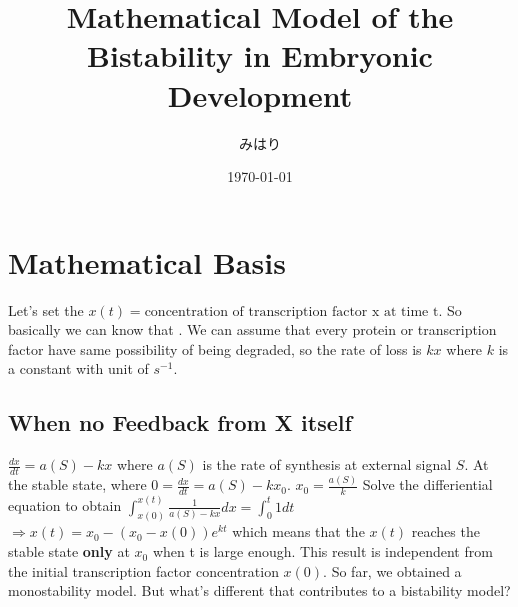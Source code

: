\documentclass[UTF8,12pt,a4paper,fontset=fandol]{ctexart}
\title{Mathematical Model of the Bistability in Embryonic Development}
\author{みはり}
\date{\today}
\begin{document}
\maketitle



\section{Mathematical Basis}
Let's set the $x(t) = \text{concentration of transcription factor x at time t}$.
\newline
So basically we can know that \newline
{}.
\newline
We can assume that every protein or transcription factor have same possibility of being degraded, so the rate of loss is
\newline $kx$
\newline where $k$ is a constant with unit of $s^{-1}$.

\subsection{When no Feedback from X itself}
$\frac{dx}{dt} = a(S) -  kx$
\newline where $a(S)$ is the rate of synthesis at external signal $S$.
\newline At the stable state, where $0=\frac{dx}{dt} = a(S) - kx_0$.
\newline $x_0 = \frac{a(S)}{k}$
\newline
Solve the differiential equation to obtain 
\newline $\int_{x(0)}^{x(t)} \frac{1}{a(S)-kx} dx = \int_{0}^{t} 1 dt$
\newline $\Rightarrow x(t) = x_0 - (x_0 - x(0))e^{kt}$
\newline which means that the $x(t)$ reaches the stable state \textbf{only} at $x_0$ when t is large enough. This result is independent from the initial transcription factor concentration $x(0)$.
\newline So far, we obtained a monostability model. But what's different that contributes to a bistability model?
\end{document}
